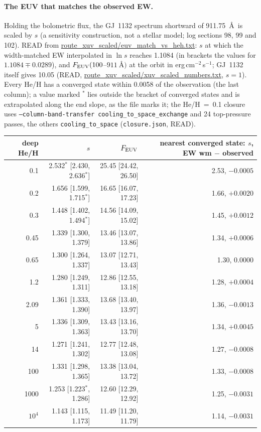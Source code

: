 \documentclass[11pt]{my_memo}
\begin{document}
\paragraph{The EUV that matches the observed EW.} Holding the bolometric
flux, the GJ~1132 spectrum shortward of 911.75~\AA\ is scaled by $s$ (a
sensitivity construction, not a stellar model; log sections 98, 99 and 102).
READ from \url{route_xuv_scaled/euv_match_vs_heh.txt}: $s$ at which the
width-matched EW interpolated in $\ln s$ reaches 1.1084 (in brackets the
values for $1.1084\mp0.0289$), and $F_{\rm EUV}(100$--$911~\mbox{\AA})$ at the
orbit in erg\,cm$^{-2}$\,s$^{-1}$; GJ~1132 itself gives 10.05 (READ,
\url{route_xuv_scaled/xuv_scaled_numbers.txt}, $s=1$). Every He/H has a
converged state within 0.0058 of the observation (the last column); a
value marked $^{*}$ lies outside the bracket of converged states and is
extrapolated along the end slope, as the file marks it; the
He/H~=~0.1 closure uses \texttt{--column-band-transfer
cooling\_to\_space\_exchange} and 24 top-pressure passes, the others
\texttt{cooling\_to\_space} (\texttt{closure.json}, READ).

\begin{center}
\footnotesize
\begin{tabular}{@{}r r r r@{}}
\toprule
deep He/H & $s$ & $F_{\rm EUV}$ & nearest converged state: $s$, EW wm $-$ observed\\
\midrule
0.1 & 2.532$^{*}$ [2.430, 2.636$^{*}$] & 25.45 [24.42, 26.50] & 2.53, $-0.0005$\\
0.2 & 1.656 [1.599, 1.715$^{*}$] & 16.65 [16.07, 17.23] & 1.66, $+0.0020$\\
0.3 & 1.448 [1.402, 1.494$^{*}$] & 14.56 [14.09, 15.02] & 1.45, $+0.0012$\\
0.45 & 1.339 [1.300, 1.379] & 13.46 [13.07, 13.86] & 1.34, $+0.0006$\\
0.65 & 1.300 [1.264, 1.337] & 13.07 [12.71, 13.43] & 1.30, $0.0000$\\
1.2 & 1.280 [1.249, 1.311] & 12.86 [12.55, 13.18] & 1.28, $+0.0004$\\
2.09 & 1.361 [1.333, 1.390] & 13.68 [13.40, 13.97] & 1.36, $-0.0013$\\
5 & 1.336 [1.309, 1.363] & 13.43 [13.16, 13.70] & 1.34, $+0.0045$\\
14 & 1.271 [1.241, 1.302] & 12.77 [12.48, 13.08] & 1.27, $-0.0008$\\
100 & 1.331 [1.298, 1.365] & 13.38 [13.04, 13.72] & 1.33, $-0.0008$\\
1000 & 1.253 [1.223$^{*}$, 1.286] & 12.60 [12.29, 12.92] & 1.25, $-0.0031$\\
$10^{4}$ & 1.143 [1.115, 1.173] & 11.49 [11.20, 11.79] & 1.14, $-0.0031$\\
\bottomrule
\end{tabular}
\end{center}
\end{document}
